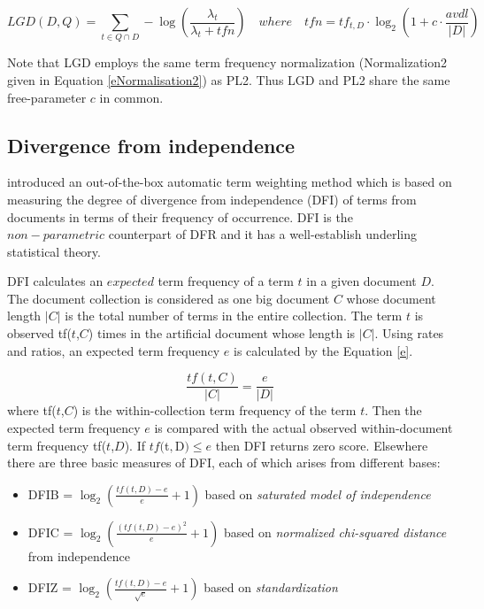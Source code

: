 \begin{equation}\label{lgd}
LGD(D, Q)=\sum_{t \in Q \cap D} -\log (\frac{\lambda_t}{\lambda_t+tfn}) \quad where \quad tfn = tf_{t,D} \cdot \log_2 (1 + c \cdot \frac{avdl}{|D|})
\end{equation}

Note that LGD employs the same term frequency normalization (Normalization2 given in Equation \ref{eNormalisation2}) as PL2.
Thus LGD and PL2 share the same free-parameter $c$ in common.

\subsection{Divergence from independence}
\citet*{dfi} introduced an out-of-the-box automatic term weighting method which is based on measuring the degree of divergence from independence (DFI) of terms from documents in terms of their frequency of occurrence. 
DFI is the $non-parametric$ counterpart of DFR and it has a well-establish underling statistical theory.

DFI calculates an $expected$ term frequency of a term $t$ in a given document $D$.
The document collection is considered as one big document $C$ whose document length $|C|$ is the total number of terms in the entire collection.
The term $t$ is observed tf($t$,$C$) times in the artificial document whose length is $|C|$.
Using rates and ratios, an expected term frequency $e$  is calculated by the Equation \ref{e}.

\begin{equation}\label{e}
\frac{tf(t,C)}{|C|}  = \frac{e}{|D|}
\end{equation}
where tf($t$,$C$) is the within-collection term frequency of the term $t$.
Then the expected term frequency $e$ is compared with the actual observed within-document term frequency tf($t$,$D$).
If $tf($t$,$D$) \leq e$ then DFI returns zero score. 
Elsewhere there are three basic measures of DFI, each of which arises from different bases:

\begin{itemize}  
\item DFIB = $\log_2{\left(\frac{tf(t,D)-e}{e}+1\right)}$ based on \emph{saturated model of independence}
\item DFIC = $\log_2{\left(\frac{(tf(t,D)-e)^2}{e}+1\right)}$ based on \emph{normalized chi-squared distance} from independence
\item DFIZ = $\log_2{\left(\frac{tf(t,D)-e}{\sqrt{e}}+1\right)}$ based on \emph{standardization}
\end{itemize}

